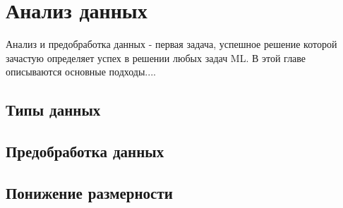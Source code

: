 \chapter{Анализ данных}

Анализ и предобработка данных - первая задача, успешное решение которой зачастую определяет успех в решении любых задач ML. В этой главе описываются основные подходы.... 


\section{Типы данных}


\section{Предобработка данных}


\section{Понижение размерности}



